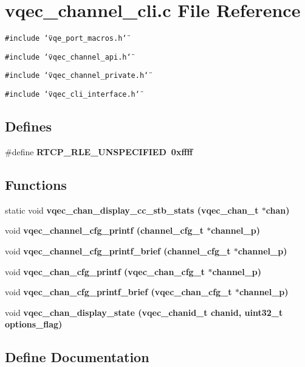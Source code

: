 \section{vqec\_\-channel\_\-cli.c File Reference}
\label{vqec__channel__cli_8c}
{\tt \#include \char`\"{}vqe\_\-port\_\-macros.h\char`\"{}}\par
{\tt \#include \char`\"{}vqec\_\-channel\_\-api.h\char`\"{}}\par
{\tt \#include \char`\"{}vqec\_\-channel\_\-private.h\char`\"{}}\par
{\tt \#include \char`\"{}vqec\_\-cli\_\-interface.h\char`\"{}}\par
\subsection*{Defines}
\begin{CompactItemize}
\item 
\#define \bf{RTCP\_\-RLE\_\-UNSPECIFIED}~0xffff
\end{CompactItemize}
\subsection*{Functions}
\begin{CompactItemize}
\item 
static void \bf{vqec\_\-chan\_\-display\_\-cc\_\-stb\_\-stats} (\bf{vqec\_\-chan\_\-t} $\ast$chan)
\item 
void \bf{vqec\_\-channel\_\-cfg\_\-printf} (channel\_\-cfg\_\-t $\ast$channel\_\-p)
\item 
void \bf{vqec\_\-channel\_\-cfg\_\-printf\_\-brief} (channel\_\-cfg\_\-t $\ast$channel\_\-p)
\item 
void \bf{vqec\_\-chan\_\-cfg\_\-printf} (\bf{vqec\_\-chan\_\-cfg\_\-t} $\ast$channel\_\-p)
\item 
void \bf{vqec\_\-chan\_\-cfg\_\-printf\_\-brief} (\bf{vqec\_\-chan\_\-cfg\_\-t} $\ast$channel\_\-p)
\item 
void \bf{vqec\_\-chan\_\-display\_\-state} (\bf{vqec\_\-chanid\_\-t} chanid, uint32\_\-t options\_\-flag)
\end{CompactItemize}


\subsection{Define Documentation}
